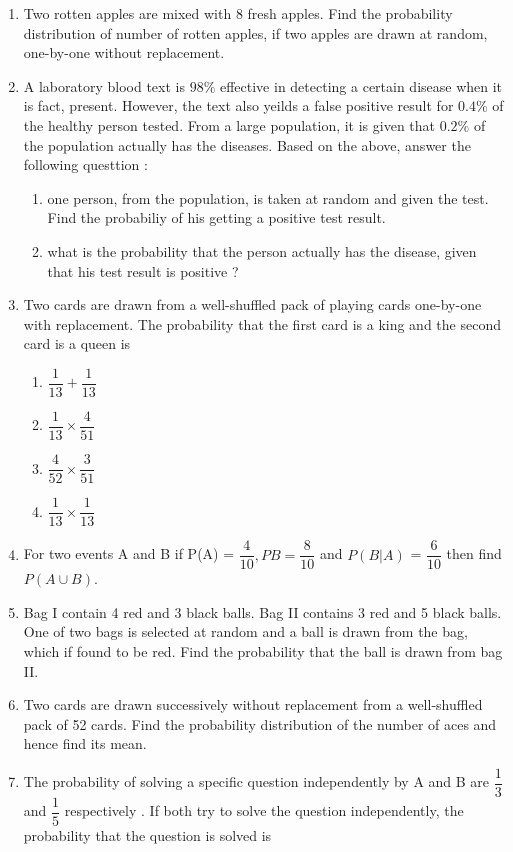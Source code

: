 \begin{enumerate}
\item Two rotten apples are mixed with 8 fresh apples. Find the probability distribution of number of rotten apples, if two apples are drawn at  random, one-by-one without replacement.
\item A laboratory blood text is $98\%$ effective  in detecting a certain disease when it is fact, present. However, the text also yeilds a false positive result for $0.4\%$ of the healthy person tested. From a large population, it is given that $0.2\%$ of the population actually has the diseases.
\newline Based on the above, answer the following questtion : \\
\begin{enumerate}
\item one person, from the population, is taken at random and given the test. Find the probabiliy of his getting a positive test result.
\item what is the probability that the person actually has the disease, given that his test result is positive ?
\end{enumerate}
\item Two cards are drawn from a well-shuffled pack of playing cards one-by-one with replacement. The probability that the first card is a king and the second card is a queen is 
\begin{enumerate}
\item $\dfrac{1}{13} + \dfrac{1}{13}$
\item $ \dfrac{1}{13} \times \dfrac{4}{51}$
\item $\dfrac{4}{52} \times \dfrac{3}{51}$
\item $\dfrac{1}{13} \times \dfrac{1}{13}$
\end{enumerate}
\item For two events A and B if P(A) = $\dfrac{4}{10}, P{B} = \dfrac{8}{10}$ and $P(B|A)$ = $\dfrac{6}{10}$ then find $P( A \cup B).$
\item Bag I contain 4 red and 3 black balls. Bag II contains 3 red and 5 black balls. One of two bags is selected at random and a ball is drawn from the bag, which if found to be red. Find the probability that the ball is drawn from bag II.
\item Two cards are drawn successively without replacement from a well-shuffled pack of 52 cards. Find the probability distribution of the number of aces and hence find its mean.
\item The probability of solving a specific question independently by A and B are $\dfrac{1}{3}$ and $\dfrac{1}{5}$ respectively . If both try to solve the question independently, the probability that the question is solved is 

\end{enumerate}
